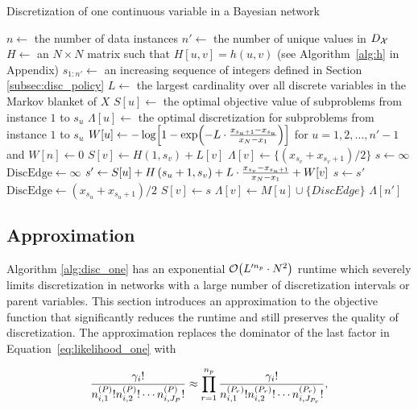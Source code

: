 \begin{algorithm}
\caption{Discretization of one continuous variable in a Bayesian network}
\label{alg:disc_one}
\begin{algorithmic}[5]
\State $n \leftarrow$ the number of data instances
\State $n' \leftarrow$ the number of unique values in $D_{\mathcal{X}}$
\State $H \leftarrow$ an $N \times N$ matrix such that $H[u,v] = h(u,v)$ (see Algorithm~\ref{alg:h} in Appendix)
\State $s_{1:n'} \leftarrow$ an increasing sequence of integers defined in Section \ref{subsec:disc_policy}
\State $L \leftarrow$ the largest cardinality over all discrete variables in the Markov blanket of $X$
\State $S[u] \leftarrow$ the optimal objective value of subproblems from instance $1$ to $s_u$
\State $\Lambda[u] \leftarrow$ the optimal discretization for subproblems from instance $1$ to $s_u$
\State $W[u]  \leftarrow - \log\brock{1 - {\exp\paren{- L \cdot{ {{x_{s_u+1} - x_{s_u}}\over{x_N - x_1}}}}}}$ for $u = 1,2, \ldots,n'-1$ and $W[n] \leftarrow 0$
\State $S[v] \leftarrow H \left(1,s_v \right) + L[v]$
\State $\Lambda[v] \leftarrow \{ ({x_{s_v} + x_{s_v+1}}) / 2\}$
\Else
\State $s \leftarrow \infty$
\State $\text{DiscEdge} \leftarrow \infty$
\State $s' \leftarrow S[u] + H \left( s_u +1,s_v \right) +  {L \cdot {{x_{s_v} - x_{s_u + 1}}\over{x_N - x_1}}} + W[v]$
\State $s \leftarrow s'$
\State $\text{DiscEdge} \leftarrow ({x_{s_u} + x_{s_u+1}}) / 2$
\EndIf
\EndFor
\State $S[v] \leftarrow s$
\State $\Lambda[v] \leftarrow M[u] \cup \{ DiscEdge \}$
\EndIf
\EndFor
 \State \Return $\Lambda[n']$
\EndFunction
\end{algorithmic}
\end{algorithm}


\subsection{Approximation}

Algorithm \ref{alg:disc_one} has an exponential $\bigo\paren{L'^{n_p} \cdot N^2}$ runtime which severely limits discretization in networks with a large number of discretization intervals or parent variables.
This section introduces an approximation to the objective function that significantly reduces the runtime and still preserves the quality of discretization.
The approximation replaces the dominator of the last factor in Equation~\ref{eq:likelihood_one} with

\begin{equation}
{\frac{{\gamma_i}!}{ {n^{(P)}_{i,1} !} {n^{(P)}_{i,2} !} \cdots {n^{(P)}_{i,J_P} !}}} \approx \prod_{r=1}^{n_p} { {{{\gamma}_i}!}\over{ {n^{(P_r)}_{i,1} !} {n^{(P_r)}_{i,2} !} \cdots {n^{(P_r)}_{i,J_{P_r}} !}}}\text{,}
\end{equation}

